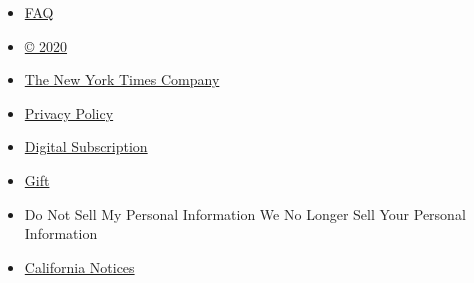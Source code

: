 \begin{itemize}
\tightlist
\item
  \href{//www.nytimes3xbfgragh.onion/subscriptions/hd/faq}{FAQ}
\item
  \href{//www.nytimes3xbfgragh.onion/content/help/rights/copyright/copyright-notice.html}{©
  2020}
\item
  \href{http://www.nytco.com/}{The New York Times Company}
\item
  \href{//www.nytimes3xbfgragh.onion/content/help/rights/privacy/policy/privacy-policy.html}{Privacy
  Policy}
\item
  \href{//www.nytimes3xbfgragh.onion/subscribe}{Digital Subscription}
\item
  \href{//www.nytimes3xbfgragh.onion/gift}{Gift}
\item
  Do Not Sell My Personal Information We No Longer Sell Your Personal
  Information
\item
  \href{https://www.nytimes3xbfgragh.onion/privacy/california-notice}{California
  Notices}
\end{itemize}
